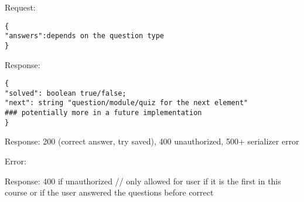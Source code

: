 Request:

\begin{verbatim}
{
"answers":depends on the question type 
}
\end{verbatim}

Response:

\begin{verbatim}
{
"solved": boolean true/false;
"next": string "question/module/quiz for the next element"
### potentially more in a future implementation
}
\end{verbatim}

Response: 200 (correct answer, try saved), 400 unauthorized, 500+
serializer error

Error:

Response: 400 if unauthorized // only allowed for user if it is the
first in this course or if the user answered the questions before
correct

